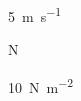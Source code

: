 \documentclass{article}
\begin{document}
\SI{5}{\meter\per\second}

\si{\newton}

\SI{10}{\newton\per\meter\squared}
\end{document}

